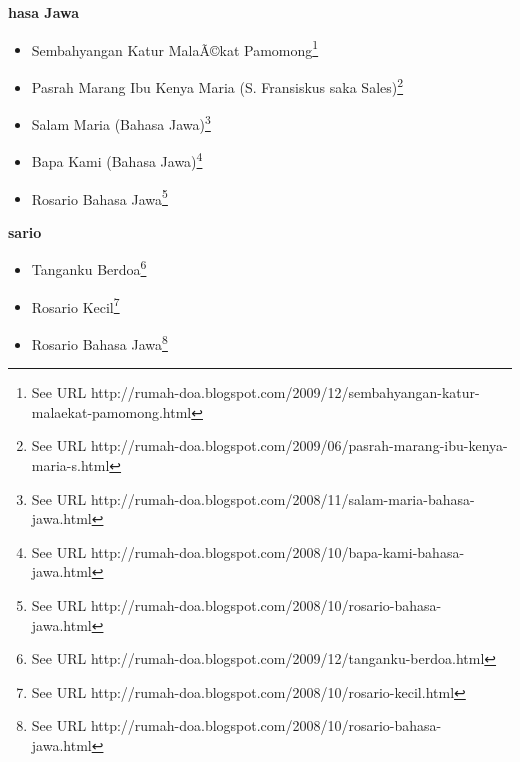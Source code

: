 \textbf{hasa Jawa}
\begin{itemize}
\item Sembahyangan Katur Mala\~A\copyright{}kat Pamomong\footnote{See URL http://rumah-doa.blogspot.com/2009/12/sembahyangan-katur-malaekat-pamomong.html}
\item Pasrah Marang Ibu Kenya Maria (S. Fransiskus saka Sales)\footnote{See URL http://rumah-doa.blogspot.com/2009/06/pasrah-marang-ibu-kenya-maria-s.html}
\item Salam Maria (Bahasa Jawa)\footnote{See URL http://rumah-doa.blogspot.com/2008/11/salam-maria-bahasa-jawa.html}
\item Bapa Kami (Bahasa Jawa)\footnote{See URL http://rumah-doa.blogspot.com/2008/10/bapa-kami-bahasa-jawa.html}
\item Rosario Bahasa Jawa\footnote{See URL http://rumah-doa.blogspot.com/2008/10/rosario-bahasa-jawa.html}
\end{itemize}


\textbf{sario}
\begin{itemize}
\item Tanganku Berdoa\footnote{See URL http://rumah-doa.blogspot.com/2009/12/tanganku-berdoa.html}
\item Rosario Kecil\footnote{See URL http://rumah-doa.blogspot.com/2008/10/rosario-kecil.html}
\item Rosario Bahasa Jawa\footnote{See URL http://rumah-doa.blogspot.com/2008/10/rosario-bahasa-jawa.html}
\end{itemize}











